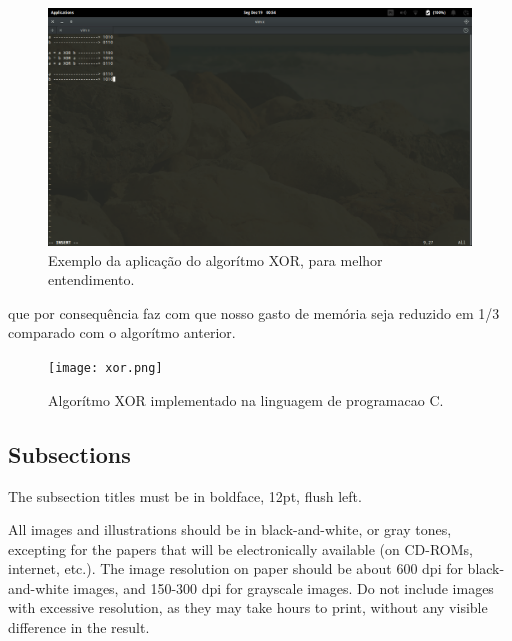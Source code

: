 \documentclass[12pt]{article}
\begin{document}
\begin{figure}[H]
\centering
\includegraphics[width=1\textwidth]{aplicacao_xor.png}
\caption{Exemplo da aplicação do algorítmo XOR, para melhor entendimento.} 
\label{fig:exampleFig3}
\end{figure}

que por consequência faz com que nosso gasto de memória seja reduzido em 1/3 comparado com o algorítmo anterior.

\begin{figure}[H]
\centering
\texttt{[image: xor.png]}
\caption{Algorítmo XOR implementado na linguagem de programacao C.} 
\label{fig:exampleFig4}
\end{figure}


\subsection{Subsections}

The subsection titles must be in boldface, 12pt, flush left.


All images and illustrations should be in black-and-white, or gray tones,
excepting for the papers that will be electronically available (on CD-ROMs,
internet, etc.). The image resolution on paper should be about 600 dpi for
black-and-white images, and 150-300 dpi for grayscale images.  Do not include
images with excessive resolution, as they may take hours to print, without any
visible difference in the result. 




\end{document}
